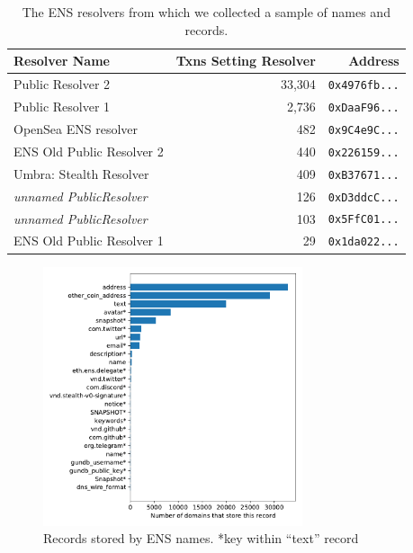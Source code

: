 \begin{table}
	\begin{tabular}{lrr}
		\toprule
		Resolver Name & Txns Setting Resolver & Address \\
		\midrule 
		Public Resolver 2 & 33,304 & \texttt{0x4976fb...} \\
		Public Resolver 1 & 2,736 & \texttt{0xDaaF96...} \\
		OpenSea ENS resolver & 482 & \texttt{0x9C4e9C...} \\
		ENS Old Public Resolver 2 & 440	& \texttt{0x226159...} \\
		Umbra: Stealth Resolver & 409 & \texttt{0xB37671...} \\
		\textit{unnamed PublicResolver} & 126 & \texttt{0xD3ddcC...} \\
		\textit{unnamed PublicResolver} & 103 & \texttt{0x5FfC01...} \\
		ENS Old Public Resolver 1 & 29 & \texttt{0x1da022...} \\
		\bottomrule
	\end{tabular}
	\caption{The ENS resolvers from which we collected a 
	sample of names and records.}
	\label{tab:ens_resolvers}
\end{table}

\begin{figure}[t]
	\centering
	\includegraphics[width=3in]{figs/ens_names.pdf}
	\caption{Records stored by ENS names. *key within ``text'' record}
	\label{fig:ens_records}
\end{figure}

